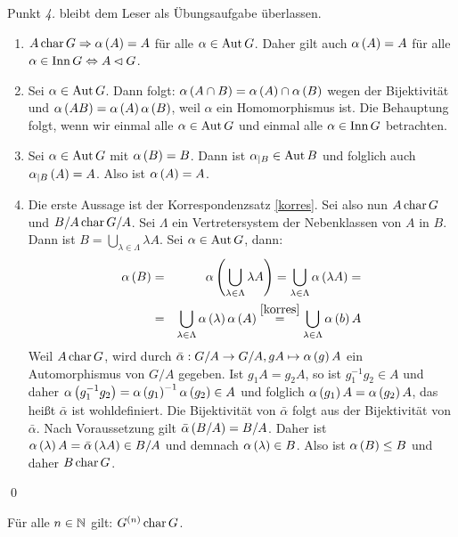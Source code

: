 \begin{beweis}
 Punkt \emph{4.} bleibt dem Leser als \"Ubungsaufgabe \"uberlassen.
 \begin{enumerate}
  \item $A \operatorname{char} G \Rightarrow \alpha\left(A\right) = A$ f\"ur alle $\alpha \in \operatorname{Aut} G$. Daher gilt auch $\alpha\left(A\right) = A$ f\"ur alle $\alpha \in \operatorname{Inn} G \Leftrightarrow A \lhd G$.
  \item Sei $\alpha \in \operatorname{Aut} G$. Dann folgt: $\alpha\left(A \cap B\right)=\alpha\left(A\right) \cap \alpha\left(B\right)$ wegen der Bijektivit\"at und $\alpha\left(AB\right) = \alpha \left(A\right)\alpha\left(B\right)$, weil $\alpha$ ein Homomorphismus ist. Die Behauptung folgt, wenn wir einmal alle $\alpha \in \operatorname{Aut} G$ und einmal alle $\alpha \in \operatorname{Inn} G$ betrachten.
  \item Sei $\alpha \in \operatorname{Aut} G$ mit $\alpha\left(B\right)=B$. Dann ist $\alpha_{\mid B} \in \operatorname{Aut} B$ und folglich auch $\alpha_{\mid B}\left(A\right)=A$. Also ist $\alpha\left(A\right)=A$.
  \setcounter{enumi}{4}
  \item Die erste Aussage ist der Korrespondenzsatz \ref{korres}. Sei also nun $A \operatorname{char} G$ und $B/A \operatorname{char} G/A$. Sei $\Lambda$ ein Vertretersystem der Nebenklassen von $A$ in $B$. Dann ist $B = \bigcup_{\lambda \in \Lambda} \lambda A$. Sei $\alpha \in \operatorname{Aut} G$, dann:
  \begin{eqnarray*}
   \alpha\left(B\right) &=& \alpha\left(\bigcup_{\lambda\in\Lambda}\lambda A\right) = \bigcup_{\lambda\in\Lambda}\alpha\left(\lambda A\right)=\\&=&\bigcup_{\lambda\in\Lambda}\alpha\left(\lambda\right)\alpha\left(A\right)\stackrel{\ref{korres}}{=}\bigcup_{\lambda\in\Lambda}\alpha\left(b\right)A
  \end{eqnarray*}
  Weil $A \operatorname{char} G$, wird durch $\bar{\alpha}: G/A \to G/A, gA \mapsto \alpha\left(g\right)A$ ein Automorphismus von $G/A$  gegeben. Ist $g_1A=g_2A$, so ist $g_1^{-1}g_2 \in A$ und daher $\alpha\left(g_1^{-1}g_2\right)=\alpha\left(g_1\right)^{-1}\alpha\left(g_2\right) \in A$ und folglich $\alpha\left(g_1\right)A=\alpha\left(g_2\right)A$, das hei\ss{}t $\bar{\alpha}$ ist wohldefiniert. Die Bijektivit\"at von $\bar{\alpha}$ folgt aus der Bijektivit\"at von $\bar{\alpha}$. Nach Voraussetzung gilt $\bar{\alpha}\left(B/A\right)=B/A$. Daher ist $\alpha\left(\lambda\right)A=\bar{\alpha}\left(\lambda A\right) \in B/A$ und demnach $\alpha\left(\lambda\right) \in B$. Also ist $\alpha\left(B\right) \leq B$ und daher $B \operatorname{char} G$.
 \end{enumerate}
 \qed
\end{beweis}

\begin{folgerung}
 F\"ur alle $n \in \mathbb{N}$ gilt: $G^{\left(n\right)} \operatorname{char} G$.
\end{folgerung}

